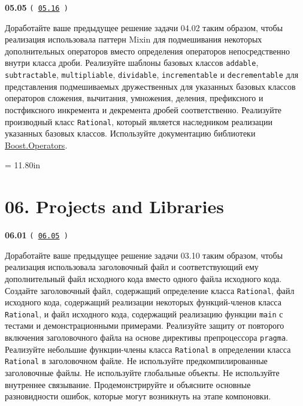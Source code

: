 \documentclass[a4paper,12pt]{article}
\begin{document}
\bigskip

{\large \textbf{05.05} \texttt{(\,\href{https://github.com/i-s-m-mipt/Education/blob/master/projects/examples/source/05.16.cpp}{05.16}\,)}}

\bigskip

Доработайте ваше предыдущее решение задачи 04.02 таким образом, чтобы реализация использовала паттерн Mixin для подмешивания некоторых дополнительных операторов вместо определения операторов непосредственно внутри класса дроби. Реализуйте шаблоны базовых классов \lstinline{addable}, \lstinline{subtractable}, \lstinline{multipliable}, \lstinline{dividable}, \lstinline{incrementable} и \lstinline{decrementable} для представления подмешиваемых дружественных для указанных базовых классов операторов сложения, вычитания, умножения, деления, префиксного и постфиксного инкремента и декремента дробей соответственно. Реализуйте производный класс \lstinline{Rational}, который является наследником реализации указанных базовых классов. Используйте документацию библиотеки \href{https://www.boost.org/doc/libs/1_84_0/libs/utility/doc/html/utility/utilities/operators.html}{Boost.Operators}.



\newpage\thispagestyle{empty}\pdfpageheight = 11.80in\enlargethispage{100in}

\section{06. Projects and Libraries}

{\large \textbf{06.01} \texttt{(\,\href{https://github.com/i-s-m-mipt/Education/blob/master/projects/examples/source/06.05.hpp}{06.05}\,)}}

\bigskip

Доработайте ваше предыдущее решение задачи 03.10 таким образом, чтобы реализация использовала заголовочный файл и соответствующий ему дополнительный файл исходного кода вместо одного файла исходного кода. Создайте заголовочный файл, содержащий определение класса \lstinline{Rational}, файл исходного кода, содержащий реализации некоторых функций-членов класса \lstinline{Rational}, и файл исходного кода, содержащий реализацию функции \lstinline{main} с тестами и демонстрационными примерами. Реализуйте защиту от повторого включения заголовочного файла на основе директивы препроцессора \lstinline{pragma}. Реализуйте небольшие функции-члены класса \lstinline{Rational} в определении класса \lstinline{Rational} в заголовочном файле. Не используйте предкомпилированные заголовочные файлы. Не используйте глобальные объекты. Не используйте внутреннее связывание. Продемонстрируйте и объясните основные разновидности ошибок, которые могут возникнуть на этапе компоновки.
\end{document}
